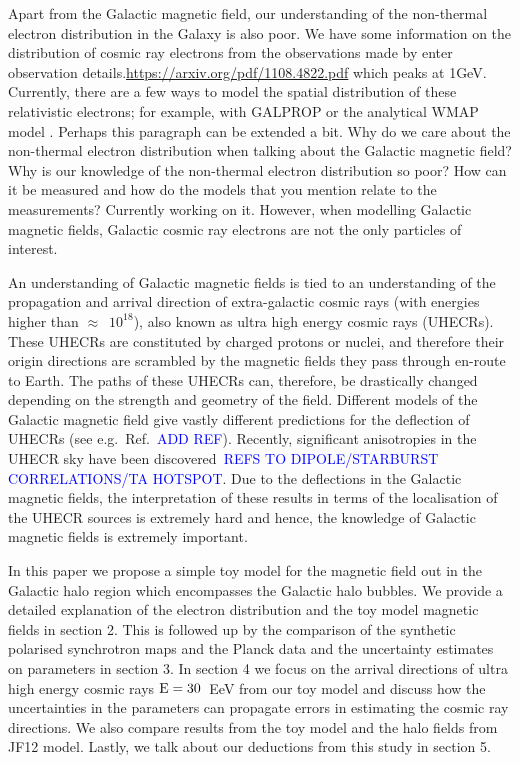 \documentclass[12pt, a4 paper]{article}
\newcommand{\Arjen}[1]{{\color{brown}#1}}
\newcommand{\Vasu}[1]{{\color{purple}#1}}
\begin{document}
Apart from the Galactic magnetic field, our understanding of the non-thermal electron distribution in the Galaxy is also poor. We have some information on the distribution of cosmic ray electrons from the observations made by \Vasu{enter observation details.}\hyperlink{CR spectra}{https://arxiv.org/pdf/1108.4822.pdf} which peaks at 1GeV.
Currently, there are a few ways to model the spatial distribution of these relativistic electrons; for example, with GALPROP \cite{Hammurabi} or the analytical WMAP model \cite{WMAP_Page}. \Arjen{Perhaps this paragraph can be extended a bit. Why do we care about the non-thermal electron distribution when talking about the Galactic magnetic field? Why is our knowledge of the non-thermal electron distribution so poor? How can it be measured and how do the models that you mention relate to the measurements?} \Vasu{Currently working on it.}
However, when modelling Galactic magnetic fields, Galactic cosmic ray electrons are not the only particles of interest. 

An understanding of Galactic magnetic fields is tied to an understanding of the propagation and arrival direction of extra-galactic cosmic rays (with energies higher than $\approx$~$10^{18}$), also known  as ultra high energy cosmic rays (UHECRs). These UHECRs are constituted by charged protons or nuclei, and therefore their origin directions are scrambled by the magnetic fields they pass through en-route to Earth. The paths of these UHECRs can, therefore, be drastically changed depending on the strength and geometry of the field. Different models of the Galactic magnetic field give vastly different predictions for the deflection of UHECRs (see e.g.~Ref.~\textcolor{blue}{ADD REF}). Recently, significant anisotropies in the UHECR sky have been discovered~\textcolor{blue}{REFS TO DIPOLE/STARBURST CORRELATIONS/TA HOTSPOT}. Due to the deflections in the Galactic magnetic fields, the interpretation of these results in terms of the localisation of the UHECR sources is extremely hard and hence, the knowledge of Galactic magnetic fields is extremely important. 

In this paper we propose a simple toy model for the magnetic field out in the Galactic halo region which encompasses the Galactic halo bubbles. We provide a detailed explanation of the electron distribution and the toy model magnetic fields in section 2. This is followed up by the comparison of the synthetic polarised synchrotron maps and the Planck data and the uncertainty estimates on parameters in section 3. In section 4 we focus on the arrival directions of ultra high energy cosmic rays $\rm E = 30$~EeV from our toy model and discuss how the uncertainties in the parameters can propagate errors in estimating the cosmic ray directions. We also compare results from the toy model and the halo fields from JF12 model. Lastly, we talk about our deductions from this study in section 5.
\end{document}
